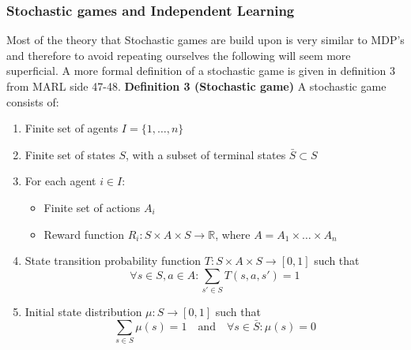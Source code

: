 \documentclass{article}
\begin{document}
\subsubsection{Stochastic games and Independent Learning}
Most of the theory that Stochastic games are build upon is very similar to MDP's and therefore to avoid repeating ourselves the following will seem more superficial. A more formal definition of a stochastic game is given in definition 3 from MARL side 47-48. 
\newline
\textbf{Definition 3 (Stochastic game)} A stochastic game consists of:
\begin{enumerate}
    \item Finite set of agents \( I = \{1, \dots, n\} \)
    \item Finite set of states \( S \), with a subset of terminal states \( \bar{S} \subset S \)
    \item For each agent \( i \in I \):
    \begin{itemize}
        \item Finite set of actions \( A_i \)
        \item Reward function \( R_i: S \times A \times S \to \mathbb{R} \), where \( A = A_1 \times \dots \times A_n \)
    \end{itemize}
    \item State transition probability function \( T: S \times A \times S \to [0, 1] \) such that
    \[
    \forall s \in S, a \in A : \sum_{s' \in S} T(s, a, s') = 1
    \]
    \item Initial state distribution \( \mu: S \to [0, 1] \) such that
    \[
    \sum_{s \in S} \mu(s) = 1 \quad \text{and} \quad \forall s \in \bar{S}: \mu(s) = 0
    \]
\end{enumerate}
\end{document}
